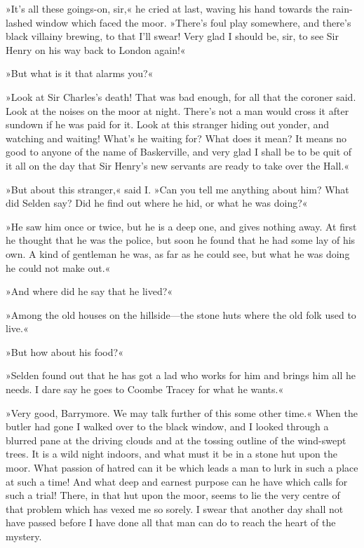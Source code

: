 »It's all these goings-on, sir,« he cried at last, waving his hand towards the rain-lashed window which faced the moor. »There's foul play somewhere, and there's black villainy brewing, to that I'll swear! Very glad I should be, sir, to see Sir Henry on his way back to London again!«

»But what is it that alarms you?«

»Look at Sir Charles's death! That was bad enough, for all that the coroner said. Look at the noises on the moor at night. There's not a man would cross it after sundown if he was paid for it. Look at this stranger hiding out yonder, and watching and waiting! What's he waiting for? What does it mean? It means no good to anyone of the name of Baskerville, and very glad I shall be to be quit of it all on the day that Sir Henry's new servants are ready to take over the Hall.«

»But about this stranger,« said I. »Can you tell me anything about him? What did Selden say? Did he find out where he hid, or what he was doing?«

»He saw him once or twice, but he is a deep one, and gives nothing away. At first he thought that he was the police, but soon he found that he had some lay of his own. A kind of gentleman he was, as far as he could see, but what he was doing he could not make out.«

»And where did he say that he lived?«

»Among the old houses on the hillside\allowbreak---\allowbreak the stone huts where the old folk used to live.«

»But how about his food?«

»Selden found out that he has got a lad who works for him and brings him all he needs. I dare say he goes to Coombe Tracey for what he wants.«

»Very good, Barrymore. We may talk further of this some other time.« When the butler had gone I walked over to the black window, and I looked through a blurred pane at the driving clouds and at the tossing outline of the wind-swept trees. It is a wild night indoors, and what must it be in a stone hut upon the moor. What passion of hatred can it be which leads a man to lurk in such a place at such a time! And what deep and earnest purpose can he have which calls for such a trial! There, in that hut upon the moor, seems to lie the very centre of that problem which has vexed me so sorely. I swear that another day shall not have passed before I have done all that man can do to reach the heart of the mystery.
